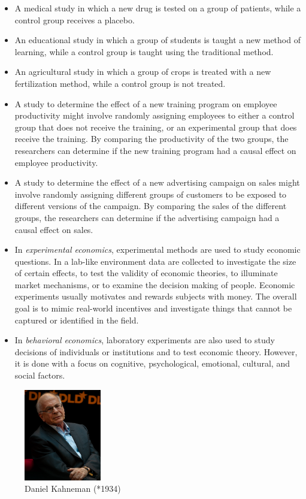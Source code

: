 \documentclass[
  12pt,
  oneside]{book}
\providecommand{\tightlist}{%
  \setlength{\itemsep}{0pt}\setlength{\parskip}{0pt}}
\theoremstyle{definition}
\theoremstyle{definition}
\theoremstyle{definition}
\theoremstyle{definition}
\theoremstyle{remark}
\begin{document}
\begin{itemize}
\tightlist
\item
  A medical study in which a new drug is tested on a group of patients, while a control group receives a placebo.
\item
  An educational study in which a group of students is taught a new method of learning, while a control group is taught using the traditional method.
\item
  An agricultural study in which a group of crops is treated with a new fertilization method, while a control group is not treated.
\item
  A study to determine the effect of a new training program on employee productivity might involve randomly assigning employees to either a control group that does not receive the training, or an experimental group that does receive the training. By comparing the productivity of the two groups, the researchers can determine if the new training program had a causal effect on employee productivity.
\item
  A study to determine the effect of a new advertising campaign on sales might involve randomly assigning different groups of customers to be exposed to different versions of the campaign. By comparing the sales of the different groups, the researchers can determine if the advertising campaign had a causal effect on sales.
\item
  In \emph{experimental economics}, experimental methods are used to study economic questions. In a lab-like environment data are collected to investigate the size of certain effects, to test the validity of economic theories, to illuminate market mechanisms, or to examine the decision making of people. Economic experiments usually motivates and rewards subjects with money. The overall goal is to mimic real-world incentives and investigate things that cannot be captured or identified in the field.
\item
  In \emph{behavioral economics}, laboratory experiments are also used to study decisions of individuals or institutions and to test economic theory. However, it is done with a focus on cognitive, psychological, emotional, cultural, and social factors.
\end{itemize}

\begin{figure}
\centering
\includegraphics[width=0.3\textwidth,height=\textheight]{fig/Daniel_Kahneman.jpg}
\caption[\label{fig:dkahnemann} Daniel Kahneman (*1934)]{\label{fig:dkahnemann} Daniel Kahneman (*1934)\footnotemark{}}
\end{figure}
\end{document}
